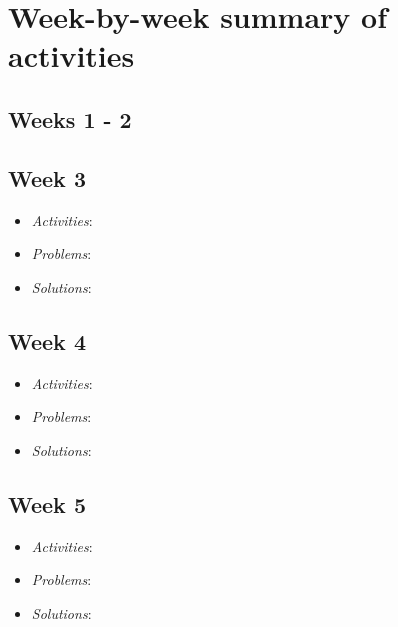 \documentclass[compsoc,draftclsnofoot,onecolumn,10pt]{IEEEtran}
\begin{document}
\section{Week-by-week summary of activities}


\subsection{Weeks 1 - 2}


\subsection{Week 3}
	\begin{itemize}
        \item \textit{Activities}:\\


        \item \textit{Problems}:\\


        \item \textit{Solutions}:\\


	\end{itemize}
 
\subsection{Week 4}
	\begin{itemize}
        \item \textit{Activities}:\\


        \item \textit{Problems}:\\


        \item \textit{Solutions}:\\


	\end{itemize}
   
\subsection{Week 5}
	\begin{itemize}
        \item \textit{Activities}:\\


        \item \textit{Problems}:\\


        \item \textit{Solutions}:\\



	\end{itemize}
   
\end{document}
